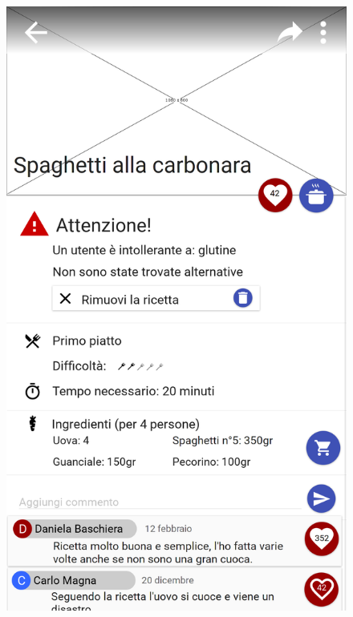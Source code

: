 \begin{figure}[H]
\begin{minipage}{.49\textwidth}
		\includegraphics[width=\textwidth]{img/wireframe/presentazione_ricetta_allergia_rimuovi_ricetta.png}
	\end{minipage}
\end{figure}
